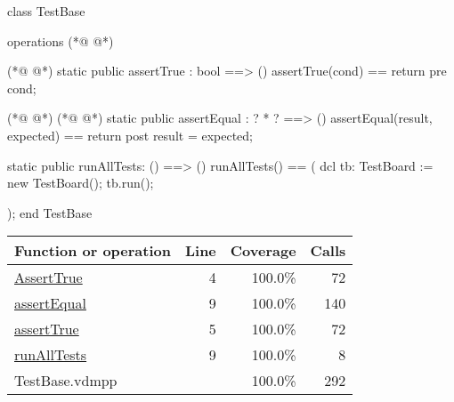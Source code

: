 \begin{vdmpp}[breaklines=true]
class TestBase

operations
(*@
\label{AssertTrue:4}
@*)
 
(*@
\label{assertTrue:5}
@*)
 static public assertTrue : bool ==> ()
  assertTrue(cond) == return
 pre cond;
  
(*@
\label{assertEqual:9}
@*)
(*@
\label{runAllTests:9}
@*)
 static public assertEqual : ? * ? ==> ()
  assertEqual(result, expected) == return
 post result = expected;
  
 static public runAllTests: () ==> ()
  runAllTests() == (
    dcl tb: TestBoard := new TestBoard();
    tb.run();
    
    );
end TestBase
\end{vdmpp}
\bigskip
\begin{longtable}{|l|r|r|r|}
\hline
Function or operation & Line & Coverage & Calls \\
\hline
\hline
\hyperref[AssertTrue:4]{AssertTrue} & 4&100.0\% & 72 \\
\hline
\hyperref[assertEqual:9]{assertEqual} & 9&100.0\% & 140 \\
\hline
\hyperref[assertTrue:5]{assertTrue} & 5&100.0\% & 72 \\
\hline
\hyperref[runAllTests:9]{runAllTests} & 9&100.0\% & 8 \\
\hline
\hline
TestBase.vdmpp & & 100.0\% & 292 \\
\hline
\end{longtable}

